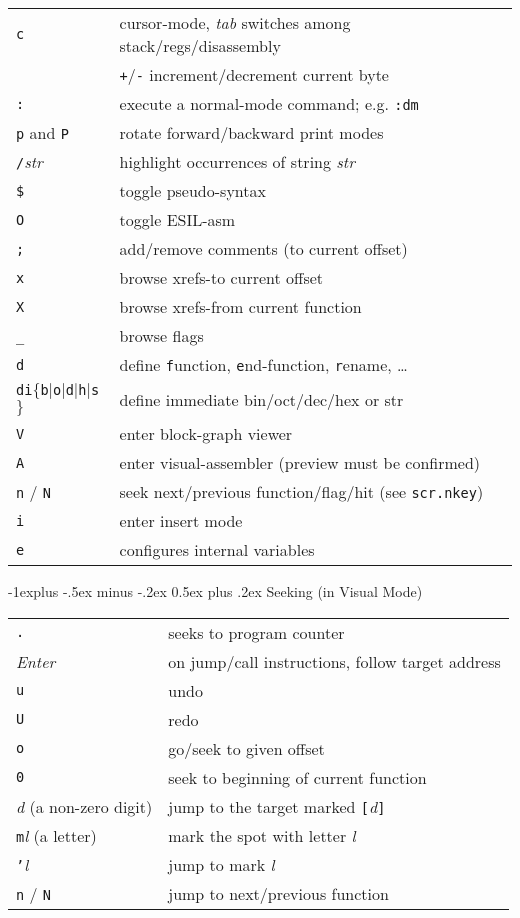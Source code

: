 \documentclass[a4paper,landscape]{article}
\makeatletter
\renewcommand{\subsection}{\@startsection{subsection}{2}{0mm}%
                                {-1explus -.5ex minus -.2ex}%
                                {0.5ex plus .2ex}%
                                {\normalfont\normalsize\bfseries}}
\makeatother
\begin{document}
\begin{multicols*}{3}
\begin{tabular}{@{}ll@{}}
\texttt{c} & cursor-mode, \textit{tab} switches among stack/regs/disassembly \\
& \texttt{+}/\texttt{-} increment/decrement current byte \\
\texttt{:} & execute a normal-mode command; e.g. \texttt{:dm} \\
\texttt{p} and \texttt{P} & rotate forward/backward print modes \\
\texttt{/}\textit{str} & highlight occurrences of string \textit{str} \\
\texttt{\$} & toggle pseudo-syntax \\
\texttt{O} & toggle ESIL-asm \\
\texttt{;} & add/remove comments (to current offset) \\
\texttt{x} & browse xrefs-to current offset \\
\texttt{X} & browse xrefs-from current function \\
\texttt{\_} & browse flags \\
\texttt{d} & define \texttt{f}unction, \texttt{e}nd-function, \texttt{r}ename, \ldots \\
\texttt{di}$\{$\texttt{b}$|$\texttt{o}$|$\texttt{d}$|$\texttt{h}$|$\texttt{s}$\}$ & define immediate bin/oct/dec/hex or str \\
\texttt{V} & enter block-graph viewer \\
\texttt{A} & enter visual-assembler (preview must be confirmed)\\
\texttt{n} / \texttt{N} & seek next/previous function/flag/hit (see \texttt{scr.nkey}) \\
\texttt{i} & enter insert mode \\
\texttt{e} & configures internal variables \\
\end{tabular}
\subsection{Seeking (in Visual Mode)}
\begin{tabular}{@{}ll@{}}
\texttt{.} & seeks to program counter \\
\textit{Enter} & on jump/call instructions, follow target address \\
\texttt{u} & undo \\
\texttt{U} & redo \\
\texttt{o} & go/seek to given offset \\
\texttt{0} & seek to beginning of current function \\
\textit{d} (a non-zero digit) & jump to the target marked \texttt{[}\textit{d}\texttt{]} \\
\texttt{m}\textit{l} (a letter) & mark the spot with letter \textit{l} \\
\texttt{'}\textit{l} & jump to mark \textit{l} \\
\texttt{n} / \texttt{N} & jump to next/previous function \\
\end{tabular}

\end{multicols*}
\end{document}
